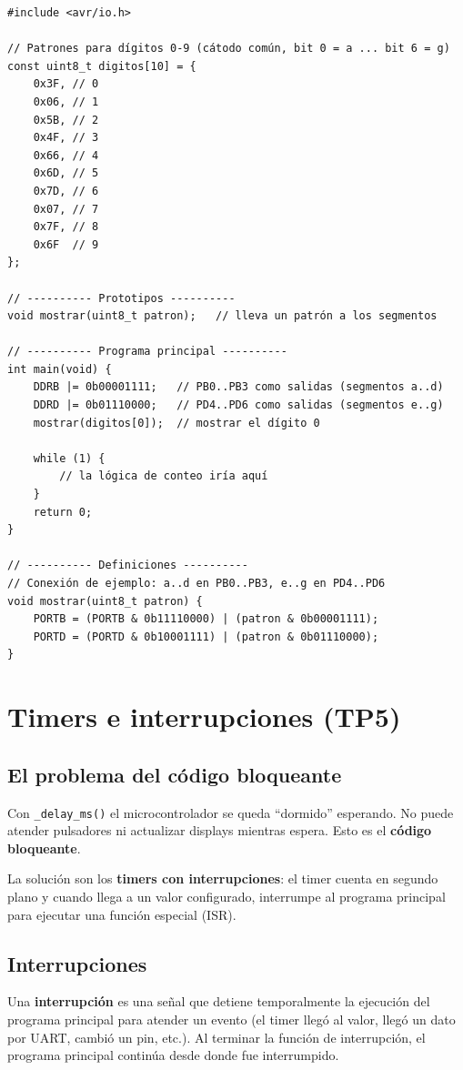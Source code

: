 \begin{lstlisting}[style=estilo-c]
#include <avr/io.h>

// Patrones para dígitos 0-9 (cátodo común, bit 0 = a ... bit 6 = g)
const uint8_t digitos[10] = {
    0x3F, // 0
    0x06, // 1
    0x5B, // 2
    0x4F, // 3
    0x66, // 4
    0x6D, // 5
    0x7D, // 6
    0x07, // 7
    0x7F, // 8
    0x6F  // 9
};

// ---------- Prototipos ----------
void mostrar(uint8_t patron);   // lleva un patrón a los segmentos

// ---------- Programa principal ----------
int main(void) {
    DDRB |= 0b00001111;   // PB0..PB3 como salidas (segmentos a..d)
    DDRD |= 0b01110000;   // PD4..PD6 como salidas (segmentos e..g)
    mostrar(digitos[0]);  // mostrar el dígito 0

    while (1) {
        // la lógica de conteo iría aquí
    }
    return 0;
}

// ---------- Definiciones ----------
// Conexión de ejemplo: a..d en PB0..PB3, e..g en PD4..PD6
void mostrar(uint8_t patron) {
    PORTB = (PORTB & 0b11110000) | (patron & 0b00001111);
    PORTD = (PORTD & 0b10001111) | (patron & 0b01110000);
}
\end{lstlisting}

\section{Timers e interrupciones (TP5)}

\subsection{El problema del código bloqueante}

Con \texttt{\_delay\_ms()} el microcontrolador se queda ``dormido'' esperando. No
puede atender pulsadores ni actualizar displays mientras espera. Esto es el
\textbf{código bloqueante}.

La solución son los \textbf{timers con interrupciones}: el timer cuenta en segundo
plano y cuando llega a un valor configurado, interrumpe al programa principal para
ejecutar una función especial (ISR).

\subsection{Interrupciones}

Una \textbf{interrupción} es una señal que detiene temporalmente la ejecución del
programa principal para atender un evento (el timer llegó al valor, llegó un dato
por UART, cambió un pin, etc.). Al terminar la función de interrupción, el programa
principal continúa desde donde fue interrumpido.

